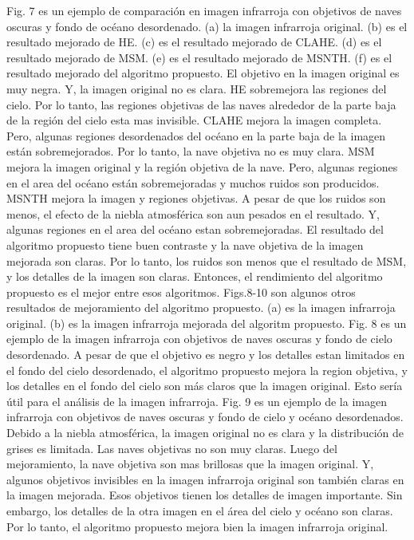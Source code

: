 \documentclass[a4paper, 11 pt, conference]{ieeeconf}      %
\begin{document}
Fig. 7 es un ejemplo de comparaci\'on en imagen infrarroja con objetivos de naves oscuras y fondo de oc\'eano desordenado. (a) la imagen infrarroja original. (b) es el resultado mejorado de HE. (c) es el resultado mejorado de CLAHE. (d) es el resultado mejorado de MSM. (e) es el resultado mejorado de MSNTH. (f) es el resultado mejorado del algoritmo propuesto. El objetivo en la imagen original es muy negra. Y, la imagen original no es clara. HE sobremejora las regiones del cielo. Por lo tanto, las regiones objetivas de las naves alrededor de la parte baja de la regi\'on del cielo esta mas invisible. CLAHE mejora la imagen completa. 
Pero, algunas regiones desordenados del oc\'eano en la parte baja de la imagen est\'an sobremejorados. Por lo tanto, la nave objetiva no es muy clara. MSM mejora la imagen original y la regi\'on objetiva de la nave. Pero, algunas regiones en el area del oc\'eano est\'an sobremejoradas y muchos ruidos son producidos. MSNTH mejora la imagen y regiones objetivas. A pesar de que los ruidos son menos, el efecto de la niebla atmosf\'erica son aun pesados en el resultado. Y, algunas regiones en el area del oc\'eano estan sobremejoradas.
El resultado del algoritmo propuesto tiene buen contraste y la nave objetiva de la imagen mejorada son claras. Por lo tanto, los ruidos son menos que el resultado de MSM, y los detalles de la imagen son claras. Entonces, el rendimiento del algoritmo propuesto es el mejor entre esos algoritmos.
Figs.8-10 son algunos otros resultados de mejoramiento del algoritmo propuesto. (a) es la imagen infrarroja original. (b) es la imagen infrarroja mejorada del algoritm propuesto. Fig. 8 es un ejemplo de la imagen infrarroja con objetivos de naves oscuras y fondo de cielo desordenado. A pesar de que el objetivo es negro y los detalles estan limitados en el fondo del cielo desordenado, el algoritmo propuesto mejora la region objetiva, y los detalles en el fondo del cielo son m\'as claros que la imagen original. Esto ser\'ia \'util para el an\'alisis de la imagen infrarroja.
Fig. 9 es un ejemplo de la imagen infrarroja con objetivos de naves oscuras y fondo de cielo y oc\'eano desordenados. Debido   a la niebla atmosf\'erica, la imagen original no es clara y la distribuci\'on de grises es limitada. Las naves objetivas no son muy claras. Luego del mejoramiento, la nave objetiva son mas brillosas que la imagen original. Y, algunos objetivos invisibles en la imagen infrarroja original son tambi\'en claras en la imagen mejorada. Esos objetivos tienen los detalles de imagen importante. Sin embargo, los detalles de la otra imagen en el \'area del cielo y oc\'eano son claras. Por lo tanto, el algoritmo propuesto mejora bien la imagen infrarroja original.
\end{document}
